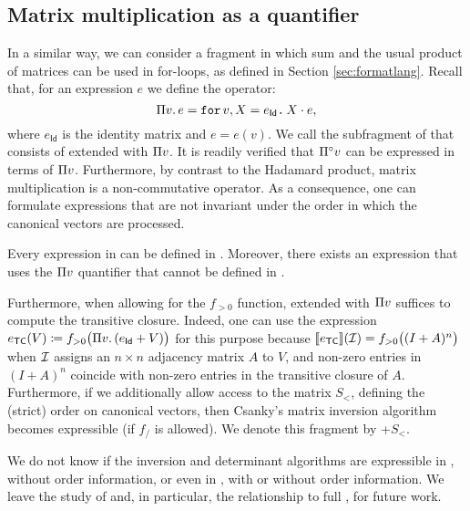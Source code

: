 

\subsection{Matrix multiplication as a quantifier}\label{subsec:langlinear}
In a similar way, we can consider a fragment in which sum and the usual product of matrices can be used
in for-loops, as defined in Section \ref{sec:formatlang}. Recall that, for an expression $e$ we define the operator:
$$
\Pi v.\,  e=\texttt{for}\, v,X = e_{\mathsf{Id}} \texttt{.}\, X\cdot e,
$$
where $e_{\mathsf{Id}}$ is the identity matrix and $e=e(v)$. We call \langmprod the subfragment of \langfor that consists of \langsum extended with $\Pi v$. It is readily verified that  $\Pi^{\circ} v$ can be expressed in terms of $\Pi v$.
Furthermore, by contrast to the Hadamard product, matrix multiplication is a non-commutative operator. As a consequence, one can formulate expressions that are not invariant under the order in which the canonical vectors
are processed. 

\begin{proposition}
	Every expression in \langprod can be defined in \langmprod. Moreover, there exists an expression that uses the $\Pi v$ quantifier that cannot be defined in \langprod. 
\end{proposition}

Furthermore, when allowing for the $f_{>0}$ function,  \langsum extended with $\Pi v$ suffices to compute the transitive closure.
Indeed, one can use the expression $e_{\mathsf{TC}}(V)\coloneqq f_{>0}\bigl(\Pi v.\, (e_{\mathsf{Id}}+V)\bigr)$ for this purpose because
 $\llbracket e_{\mathsf{TC}} \rrbracket(\mathcal{I})=f_{>0}\bigl((I+A)^n\bigr)$ when $\mathcal{I}$ assigns an $n\times n$ adjacency matrix $A$ to $V$, and non-zero entries in $(I+A)^n$ coincide with non-zero entries in  the transitive closure of $A$.
Furthermore, if we additionally allow access to the matrix $S_{<}$, defining the (strict) order on canonical vectors, then Csanky's matrix inversion algorithm becomes expressible (if $f_/$ is allowed). We denote this fragment by \langmprod+$S_{<}$. 



 We do not know if the inversion and determinant algorithms are expressible in \langmprod, without order information, or even  in  \langprod, with or without order information. We leave the study of \langmprod and, in particular, the relationship to full \langfor, for future work.
 
